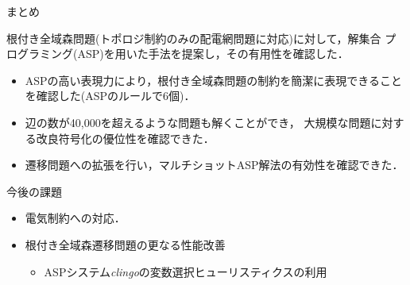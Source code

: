 \documentclass[dvipdfmx,11pt]{beamer}
\begin{document}
\begin{frame}{まとめ}
\begin{alertblock}{}
  根付き全域森問題(トポロジ制約のみの配電網問題に対応)に対して，解集合
  プログラミング(ASP)を用いた手法を提案し，その有用性を確認した．
\end{alertblock}
\begin{itemize}
\item {}
  ASPの高い表現力により，根付き全域森問題の制約を簡潔に表現できること
  を確認した(ASPのルールで6個)．
\item {}
  辺の数が40,000を超えるような問題も解くことができ，
  大規模な問題に対する改良符号化の優位性を確認できた．
\item {}
  遷移問題への拡張を行い，マルチショットASP解法の有効性を確認できた．
\end{itemize}
\vfill
\begin{block}{今後の課題}
  \begin{itemize}
  \item 電気制約への対応．
  \item 根付き全域森遷移問題の更なる性能改善
    \begin{itemize}
    \item ASPシステム\textit{clingo}の変数選択ヒューリスティクスの利用
    \end{itemize}
  \end{itemize}
 \end{block}
\end{frame}


\end{document}
